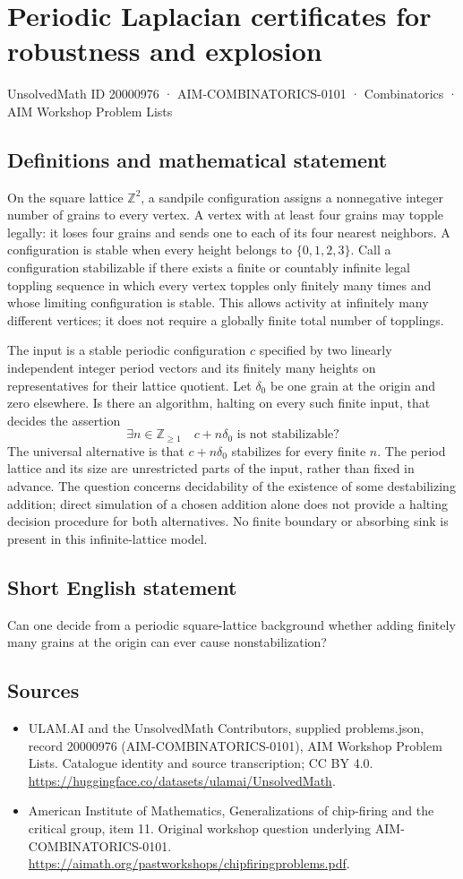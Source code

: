 \documentclass[11pt,a4paper]{article}
\begin{document}
\section*{Periodic Laplacian certificates for robustness and explosion}\label{20000976}
{\small UnsolvedMath ID 20000976 · AIM-COMBINATORICS-0101 · Combinatorics · AIM Workshop Problem Lists}
\subsection{Definitions and mathematical statement}
On the square lattice $\mathbb Z^2$, a sandpile configuration assigns a nonnegative integer number of grains to every vertex.
A vertex with at least four grains may topple legally: it loses four grains and sends one to each of its four nearest neighbors.
A configuration is stable when every height belongs to $\{0,1,2,3\}$.
Call a configuration stabilizable if there exists a finite or countably infinite legal toppling sequence in which every vertex topples only finitely many times and whose limiting configuration is stable.
This allows activity at infinitely many different vertices; it does not require a globally finite total number of topplings.

The input is a stable periodic configuration $c$ specified by two linearly independent integer period vectors and its finitely many heights on representatives for their lattice quotient.
Let $\delta_0$ be one grain at the origin and zero elsewhere.
Is there an algorithm, halting on every such finite input, that decides the assertion
\[
 \exists n\in\mathbb Z_{\geq1}\quad
           c+n\delta_0\text{ is not stabilizable}?
\]
The universal alternative is that $c+n\delta_0$ stabilizes for every finite $n$.
The period lattice and its size are unrestricted parts of the input, rather than fixed in advance.
The question concerns decidability of the existence of some destabilizing addition; direct simulation of a chosen addition alone does not provide a halting decision procedure for both alternatives.
No finite boundary or absorbing sink is present in this infinite-lattice model.
\subsection{Short English statement}
Can one decide from a periodic square-lattice background whether adding finitely many grains at the origin can ever cause nonstabilization?
\subsection{Sources}
\begin{itemize}
\item[S1] ULAM.AI and the UnsolvedMath Contributors, supplied problems.json, record 20000976 (AIM-COMBINATORICS-0101), AIM Workshop Problem Lists. Catalogue identity and source transcription; CC BY 4.0.
\url{https://huggingface.co/datasets/ulamai/UnsolvedMath}.
\item[S2] American Institute of Mathematics, Generalizations of chip-firing and the critical group, item 11. Original workshop question underlying AIM-COMBINATORICS-0101.
\url{https://aimath.org/pastworkshops/chipfiringproblems.pdf}.
\end{itemize}
\end{document}
